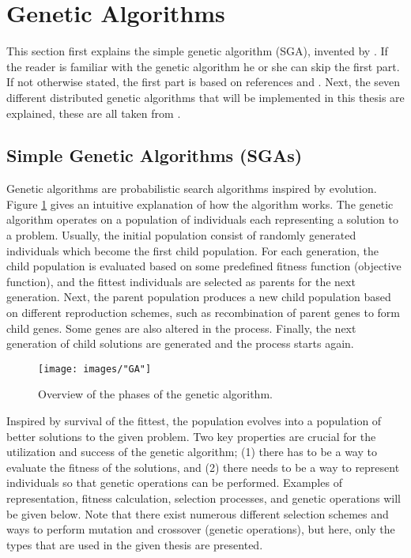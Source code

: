 \section{Genetic Algorithms}\label{section:ga}
This section first explains the simple genetic algorithm (SGA), invented by \cite{Holland}. If the reader is familiar with the genetic algorithm he or she can skip the first part. If not otherwise stated, the first part is based on references \citep{Holland} and \citep{Goldberg}. Next, the seven different distributed genetic algorithms that will be implemented in this thesis are explained, these are all taken from \cite{Gong}.


\subsection{Simple Genetic Algorithms (SGAs)}\label{subsection:sga}
Genetic algorithms are probabilistic search algorithms inspired by evolution. Figure \ref{GA} gives an intuitive explanation of how the algorithm works. The genetic algorithm operates on a population of individuals each representing a solution to a problem. Usually, the initial population consist of randomly generated individuals which become the first child population. For each generation, the child population is evaluated based on some predefined fitness function (objective function), and the fittest individuals are selected as parents for the next generation. Next, the parent population produces a new child population based on different reproduction schemes, such as recombination of parent genes to form child genes. Some genes are also altered in the process. Finally, the next generation of child solutions are generated and the process starts again.\\


\begin{figure}[h!]
\begin{center}
\texttt{[image: images/"GA"]}
\caption{Overview of the phases of the genetic algorithm.}
\label{GA}
\end{center}
\end{figure}


\noindent Inspired by survival of the fittest, the population evolves into a population of better solutions to the given problem. Two key properties are crucial for the utilization and success of the genetic algorithm; (1) there has to be a way to evaluate the fitness of the solutions, and (2) there needs to be a way to represent individuals so that genetic operations can be performed. Examples of representation, fitness calculation, selection processes, and genetic operations will be given below. Note that there exist numerous different selection schemes and ways to perform mutation and crossover (genetic operations), but here, only the types that are used in the given thesis are presented. \\



